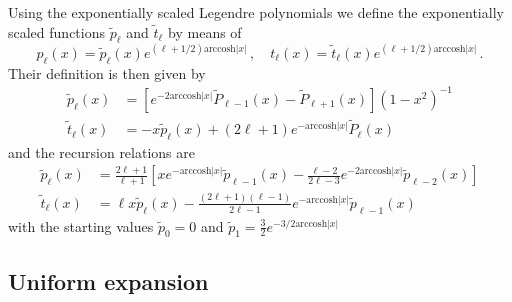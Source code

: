 \documentclass[onecolumn%
              ,superscriptaddress%
              ,aps%
              ,pra]{revtex4}
\begin{document}
Using the exponentially scaled Legendre polynomials we define the exponentially scaled functions $\tilde p_\ell$ and $\tilde t_\ell$ by means of
\begin{equation}
p_\ell(x) = \tilde p_\ell(x) e^{(\ell+1/2)\mathrm{arccosh}\vert x\vert}\,,\quad t_\ell(x) = \tilde t_\ell(x) e^{(\ell+1/2)\mathrm{arccosh}\vert x\vert}\,.
\end{equation}
Their definition is then given by
\begin{equation}
\begin{aligned}
\tilde p_\ell(x) & = \left[e^{-2\mathrm{arccosh}\vert x\vert}\tilde P_{\ell-1}(x)-\tilde P_{\ell+1}(x)\right](1-x^2)^{-1} \\
\tilde t_\ell(x) & = -x \tilde p_\ell(x) + (2\ell+1)e^{-\mathrm{arccosh}\vert x\vert}\tilde P_\ell(x)
\end{aligned}
\end{equation}
and the recursion relations are
\begin{equation}
\begin{aligned}
\tilde p_\ell(x) &= \frac{2\ell+1}{\ell+1}\left[xe^{-\mathrm{arccosh}\vert x\vert} \tilde p_{\ell-1}(x) - \frac{\ell-2}{2\ell-3}e^{-2\mathrm{arccosh}\vert x\vert}\tilde p_{\ell-2}(x)\right] \\
\tilde t_\ell(x) &= \ell x \tilde p_\ell(x) - \frac{(2\ell+1)(\ell-1)}{2\ell-1} e^{-\mathrm{arccosh}\vert x\vert} \tilde p_{\ell-1}(x)
\end{aligned}
\end{equation}
with the starting values $\tilde p_0 = 0$ and $\tilde p_1 = \frac{3}{2} e^{-3/2 \mathrm{arccosh}\vert x\vert}$

\subsection{Uniform expansion}
\end{document}
